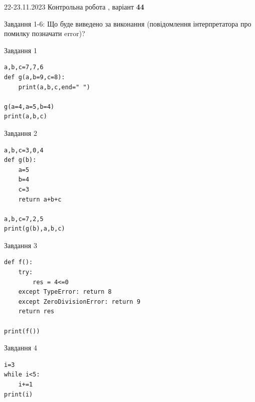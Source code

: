 \documentclass[12pt, ukrainian]{article}
\begin{document}
{{22-23.11.2023 Контрольна робота , варіант  \No \textbf { 44 }\par}}
{

Завдання 1-6: Що буде виведено за виконання (повідомлення інтерпретатора про помилку позначати error)?


\begin{minipage}[t]{9.7cm}                
{\begin{center}Завдання {1}\end{center}}
\begin{verbatim}
a,b,c=7,7,6
def g(a,b=9,c=8):
    print(a,b,c,end=" ")

g(a=4,a=5,b=4)
print(a,b,c)
\end{verbatim}     
\end{minipage}
\vline \hspace{8mm}
\begin{minipage}[t]{8.0cm}                
{\begin{center}Завдання {2}\end{center}}
\begin{verbatim}
a,b,c=3,0,4
def g(b):
    a=5
    b=4
    c=3
    return a+b+c

a,b,c=7,2,5
print(g(b),a,b,c)
\end{verbatim}     
\end{minipage}

\vspace{15mm}
\begin{minipage}[t]{9.7cm}                
{\begin{center}Завдання {3}\end{center}}
\begin{verbatim}
def f():
    try:
        res = 4<=0
    except TypeError: return 8
    except ZeroDivisionError: return 9
    return res

print(f())
\end{verbatim}     
\end{minipage}
\vline \hspace{8mm}
\begin{minipage}[t]{8.0cm}                
{\begin{center}Завдання {4}\end{center}}
\begin{verbatim}
i=3
while i<5:
    i+=1
print(i)
\end{verbatim}     
\end{minipage}

}
\end{document}
